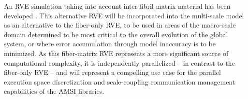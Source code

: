 \documentclass[11pt]{article}
\begin{document}
An RVE simulation taking into account inter-fibril matrix material has been developed \cite{lake2012mechanics} \cite{zhang2013cross} \cite{zhang2013coupled}. This alternative RVE will be incorporated into the multi-scale model as an alternative to the fiber-only RVE, to be used in areas of the macro-scale domain determined to be most critical to the overall evolution of the global system, or where error accumulation through model inaccuracy is to be minimized. As this fiber-matrix RVE represents a more significant source of computational complexity, it is independently parallelized -- in contrast to the fiber-only RVE -- and will represent a compelling use case for the parallel execution space discretization and scale-coupling communication management capabilities of the AMSI libraries.

\end{document}
